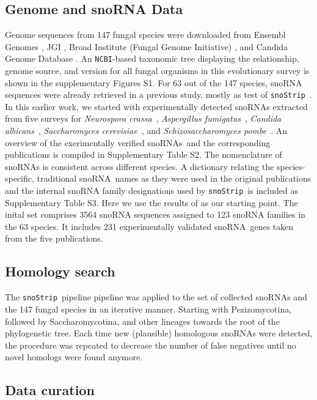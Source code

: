 \documentclass[preprint,3p,times,twocolumn]{elsarticle}
\newcommand{\snos}{snoRNAs}
\newcommand{\sno}{snoRNA}
\newcommand{\snostrip}{\texttt{snoStrip}}
\newcommand{\ncbi}{\texttt{NCBI}}
\newcommand{\Afu}{\emph{Aspergillus fumigatus}}
\newcommand{\Calb}{\emph{Candida albicans}}
\newcommand{\Spo}{\emph{Schizosaccharomyces pombe}}
\newcommand{\Ncr}{\emph{Neurospora crassa}}
\newcommand{\Sce}{\emph{Saccharomyces cerevisiae}}
\begin{document}
\subsection{Genome and snoRNA Data} 

Genome sequences from 147 fungal species were downloaded from Ensembl
Genomes \cite{Kersey:2016}, JGI \cite{Nordberg:2014}, Broad Institute
(Fungal Genome Initiative) , and Candida Genome Database
\cite{Skrzypek:2017}.  An \ncbi-based taxonomic tree displaying the
relationship, genome source, and version for all fungal organisms in this
evolutionary survey is shown in the supplementary Figures S1.  For 63 out
of the 147 species, snoRNA sequences were already retrieved in a previous
study, mostly as test of \snostrip\ \cite{Bartschat:2014}.  In this earlier
work, we started with experimentally detected snoRNAs extracted from five
surveys for \Ncr\ \citep{Liu:2009}, \Afu\ \citep{Joechl:2008}, \Calb\
\citep{Mitrovich:2010}, \Sce\ \citep{Piekna-Przybylska:2007}, and \Spo\
\citep{Li:2005}. An overview of the exerimentally verified \snos\ and the
corresponding publications is compiled in Supplementary Table S2. The
nomenclature of snoRNAs is consistent across different species. A
dictionary relating the species-specific, traditional \sno\ names as they
were used in the original publications and the internal snoRNA family
designations used by \snostrip\ is included as Supplementary Table S3.
Here we use the results of \cite{Bartschat:2014} as our starting point.
The inital set comprises 3564 snoRNA sequences assigned to 123 snoRNA
families in the 63 species. It includes 231 experimentally validated \sno\
genes taken from the five publications.

\subsection{Homology search}

The \snostrip\ pipeline \citep{Bartschat:2014}pipeline was applied to the
set of collected snoRNAs and the 147 fungal species in an iterative
manner. Starting with Pezizomycotina, followed by Saccharomycotina, and
other lineages towards the root of the phylogenetic tree. Each time new
(plausible) homologous snoRNAs were detected, the procedure was repeated to
decrease the number of false negatives until no novel homologs were found
anymore.

\subsection{Data curation}
\end{document}
